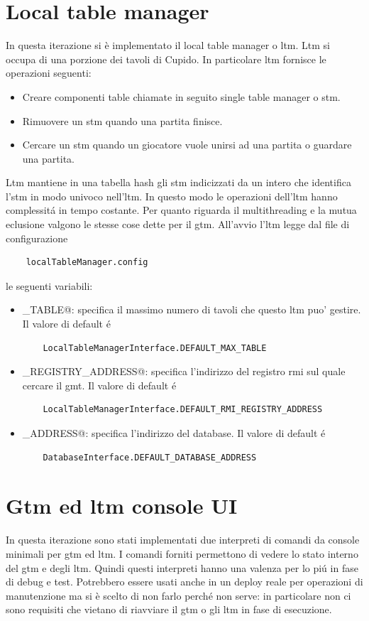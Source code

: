 \section{Local table manager}
  In questa iterazione si \`e implementato il local table manager o ltm. Ltm si occupa di una porzione dei tavoli di Cupido. In particolare ltm fornisce le operazioni seguenti:
  \begin{itemize}
    \item 
      Creare componenti table chiamate in seguito single table manager o stm.
    \item 
      Rimuovere un stm quando una partita finisce.
    \item 
      Cercare un stm quando un giocatore vuole unirsi ad una partita o guardare una partita.
  \end{itemize}
  Ltm mantiene in una tabella hash gli stm indicizzati da un intero che identifica l'stm in modo univoco nell'ltm. In questo modo le operazioni dell'ltm hanno complessit\'a in tempo costante.
  Per quanto riguarda il multithreading e la mutua eclusione valgono le stesse cose dette per il gtm. 
  All'avvio l'ltm legge dal file di configurazione 
  \begin{verbatim}
    localTableManager.config
  \end{verbatim}
  le seguenti variabili:
  \begin{itemize}
    \item
      \verb@MAX_TABLE@: specifica il massimo numero di tavoli che questo ltm puo' gestire. Il valore di default \'e
      \begin{verbatim}
	LocalTableManagerInterface.DEFAULT_MAX_TABLE
      \end{verbatim}
    \item
      \verb@RMI_REGISTRY_ADDRESS@: specifica l'indirizzo del registro rmi sul quale cercare il gmt. Il valore di default \'e
      \begin{verbatim}
	LocalTableManagerInterface.DEFAULT_RMI_REGISTRY_ADDRESS
      \end{verbatim}
    \item
      \verb@DATABASE_ADDRESS@: specifica l'indirizzo del database. Il valore di default \'e
      \begin{verbatim}
	DatabaseInterface.DEFAULT_DATABASE_ADDRESS
      \end{verbatim} 
  \end{itemize}


\section{Gtm ed ltm console UI}
  In questa iterazione sono stati implementati due interpreti di comandi da console minimali per gtm ed ltm. I comandi forniti permettono di vedere lo stato interno del gtm e degli ltm. Quindi questi interpreti hanno una valenza per lo pi\'u in fase di debug e test. Potrebbero essere usati anche in un deploy reale per operazioni di manutenzione ma si \`e scelto di non farlo perch\'e non serve: in particolare non ci sono requisiti che vietano di riavviare il gtm o gli ltm in fase di esecuzione.

